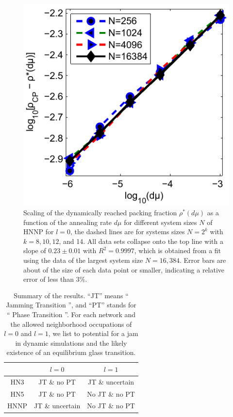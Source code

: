 \begin{figure}
\centering \includegraphics[width=0.5\columnwidth]{Chapter-2/Paper_HNNP_Decay}
\protect\caption{Scaling of the dynamically reached packing fraction $\rho^{*}(d\mu)$
as a function of the annealing rate $d\mu$ for different system sizes
$N$ of HNNP for $l=0$, the dashed lines are for systems sizes $N=2^{k}$
with $k=8,10,12$, and 14. All data sets collapse onto the top line
with a slope of $0.23\pm0.01$ with $R^{2}=0.9997$, which is obtained
from a fit using the data of the largest system size $N=16,384$. Error
bars are about of the size of each data point or smaller, indicating
a relative error of less than $3\%$. }

\label{fig:HNNPDecay} 
\end{figure}


\begin{table}
\begin{centering}
\protect\caption{Summary of the results. \enquote{JT} means \enquote{ Jamming Transition }, and \enquote{PT} stands for \enquote{ Phase Transition }. For each network and the allowed neighborhood
occupations of $l=0$ and $l=1$, we list to potential for a jam in
dynamic simulations and the likely existence of an equilibrium glass
transition.}

\par\end{centering}

\begin{centering}
\label{tab:summary}
\par\end{centering}

\centering{}%
\begin{tabular}{|c|c||c|}
\hline 
 & $l=0$  & $l=1$ \tabularnewline
\hline 
\hline 
HN3  & JT \& no PT  & JT \& uncertain \tabularnewline
\hline 
HN5  & JT \& no PT  & No JT \& no PT \tabularnewline
\hline 
HNNP  & JT \& uncertain  & No JT \& no PT \tabularnewline
\hline 
\end{tabular}
\end{table}



